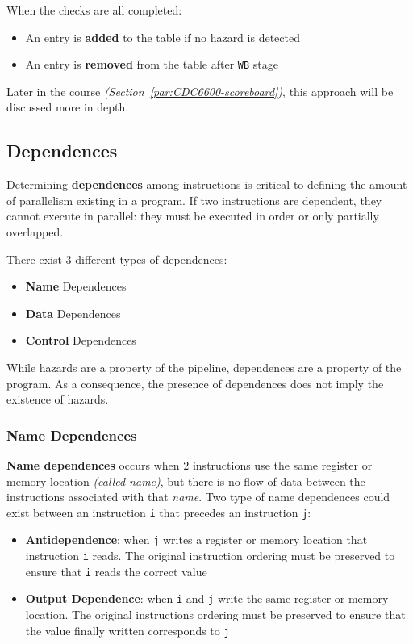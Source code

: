 \documentclass[english]{article}
\begin{document}
When the checks are all completed:

\begin{itemize}
  \item An entry is \textbf{added} to the table if no hazard is detected
  \item An entry is \textbf{removed} from the table after \texttt{WB} stage
\end{itemize}

\bigskip
Later in the course \textit{(Section~\ref{par:CDC6600-scoreboard})}, this approach will be discussed more in depth.

\subsection{Dependences}

Determining \textbf{dependences} among instructions is critical to defining the amount of parallelism existing in a program.
If two instructions are dependent, they cannot execute in parallel: they must be executed in order or only partially overlapped.

There exist \(3\) different types of dependences:

\begin{itemize}
  \item \textbf{Name} Dependences
  \item \textbf{Data} Dependences
  \item \textbf{Control} Dependences
\end{itemize}

While hazards are a property of the pipeline, dependences are a property of the program.
As a consequence, the presence of dependences does not imply the existence of hazards.

\subsubsection{Name Dependences}

\textbf{Name dependences} occurs when \(2\) instructions use the same register or memory location \textit{(called name)}, but there is no flow of data between the instructions associated with that \textit{name}.
Two type of name dependences could exist between an instruction \texttt{i} that precedes an instruction \texttt{j}:

\begin{itemize}
  \item \textbf{Antidependence}: when \texttt{j} writes a register or memory location that instruction \texttt{i} reads. The original instruction ordering must be preserved to ensure that \texttt{i} reads the correct value
  \item \textbf{Output Dependence}: when \texttt{i} and \texttt{j} write the same register or memory location. The original instructions ordering must be preserved to ensure that the value finally written corresponds to \texttt{j}
\end{itemize}
\end{document}
